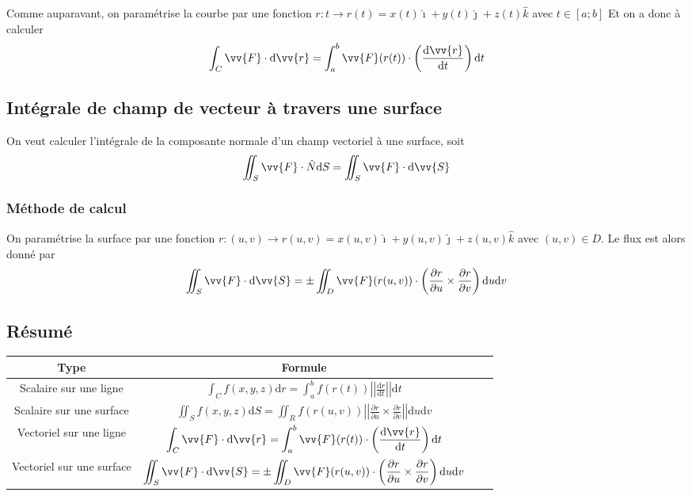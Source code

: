 \documentclass[11pt,a4paper]{article}
\theoremstyle{definition}
\newcommand{\dif}{\mathrm{d}}
\newcommand{\kmath}{k}
\newcommand{\fl}{\rightarrow}
\newcommand{\pa}{\partial}
\begin{document}
Comme auparavant, on paramétrise la courbe par une fonction $r : t \fl r(t) = x(t) \hat{\imath} + y(t) \hat{\jmath} + z(t) \hat{\kmath}$ avec $t \in [a;b]$
Et on a donc à calculer
\[ \int_C \vv{F} \cdot \dif \vv{r} = \int_a^b \vv{F}(r(t)) \cdot \left(  \frac{\dif \vv{r}}{\dif t} \right) \dif t \]

\subsection{Intégrale de champ de vecteur à travers une surface}

On veut calculer l'intégrale de la composante normale d'un champ vectoriel à une surface, soit
\[ \iint_S \vv{F} \cdot \hat{N} \dif S = \iint_S \vv{F} \cdot \dif \vv{S} \]

\subsubsection{Méthode de calcul}

On paramétrise la surface par une fonction $r : (u,v) \fl r(u,v) = x(u,v) \hat{\imath} + y(u,v) \hat{\jmath} + z(u,v) \hat{\kmath}$ avec $(u,v) \in D$. Le flux est alors donné par
\[ \iint_S \vv{F} \cdot \dif \vv{S} = \pm \iint_D \vv{F}(r(u,v)) \cdot \left( \frac{\pa r}{\pa u} \times \frac{\pa r}{\pa v} \right) \dif u \dif v \]

\subsection{Résumé}

\begin{center}
\begin{tabular}{|S c|S c|}
\hline
\textbf{Type} & \textbf{Formule} \\
\hline
Scalaire sur une ligne & $\displaystyle \int_C f(x,y,z) \dif r = \int_a^b f(r(t)) \left|\left| \frac{\dif r}{\dif t} \right| \right| \dif t$ \\
\hline
Scalaire sur une surface & $\displaystyle \iint_S f(x,y,z) \dif S = \iint_R f(r(u,v)) \left| \left| \frac{\pa r}{\pa u} \times \frac{\pa r}{\pa v} \right| \right| \dif u \dif v $ \\
\hline
Vectoriel sur une ligne & $ \displaystyle \int_C \vv{F} \cdot \dif \vv{r} = \int_a^b \vv{F}(r(t)) \cdot \left(  \frac{\dif \vv{r}}{\dif t} \right) \dif t $ \\
\hline
Vectoriel sur une surface & $ \displaystyle \iint_S \vv{F} \cdot \dif \vv{S} = \pm \iint_D \vv{F}(r(u,v)) \cdot \left( \frac{\pa r}{\pa u} \times \frac{\pa r}{\pa v} \right) \dif u \dif v $ \\
\hline
\end{tabular}
\end{center}
\end{document}
